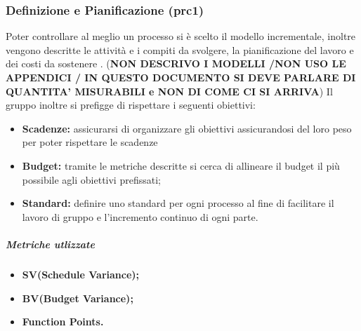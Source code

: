 \subsubsection{Definizione e Pianificazione (prc1)}
Poter controllare al meglio un processo si è scelto il modello incrementale, inoltre vengono descritte le attività e i compiti da svolgere, la pianificazione del lavoro e dei costi da sostenere . (\textbf{NON DESCRIVO I MODELLI /NON USO LE APPENDICI / IN QUESTO DOCUMENTO SI DEVE PARLARE DI QUANTITA' MISURABILI e NON DI COME CI SI ARRIVA}) Il gruppo inoltre si prefigge di rispettare i seguenti obiettivi:
\begin{itemize}
		\item{\textbf{Scadenze:} assicurarsi di organizzare gli obiettivi assicurandosi del loro peso per poter rispettare le scadenze}
		\item{\textbf{Budget:} tramite le metriche descritte si cerca di allineare il budget il più possibile agli obiettivi prefissati;}
		\item{\textbf{Standard:} definire uno standard per ogni processo al fine di facilitare il lavoro di gruppo e l'incremento continuo di ogni parte.}
\end{itemize} 
\subparagraph{Metriche utlizzate}
\begin{itemize}
	\item{\textbf{SV(Schedule Variance);}}
	\item{\textbf{BV(Budget Variance);}}
	\item{\textbf{Function Points.} }
\end{itemize}
\begin{table}[!htpb]
	\centering
	\renewcommand{\arraystretch}{2} 
	\caption{Metriche utilizzate per la Definizione e Pianificazione}
\end{table}

